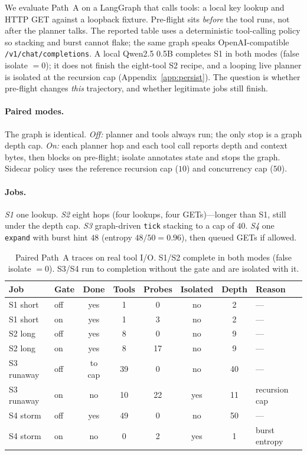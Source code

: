 \documentclass{article}
\begin{document}
We evaluate Path~A on a LangGraph that calls tools: a local key lookup and HTTP GET against a loopback fixture.
Pre-flight sits \emph{before} the tool runs, not after the planner talks.
The reported table uses a deterministic tool-calling policy so stacking and burst cannot flake; the same graph speaks OpenAI-compatible \texttt{/v1/chat/completions}.
A local Qwen2.5 0.5B completes S1 in both modes (false isolate $=0$); it does not finish the eight-tool S2 recipe, and a looping live planner is isolated at the recursion cap (Appendix~\ref{app:persist}).
The question is whether pre-flight changes \emph{this} trajectory, and whether legitimate jobs still finish.

\paragraph{Paired modes.}
The graph is identical.
\emph{Off:} planner and tools always run; the only stop is a graph depth cap.
\emph{On:} each planner hop and each tool call reports depth and context bytes, then blocks on pre-flight; isolate annotates state and stops the graph.
Sidecar policy uses the reference recursion cap ($10$) and concurrency cap ($50$).

\paragraph{Jobs.}
\emph{S1} one lookup.
\emph{S2} eight hops (four lookups, four GETs)---longer than S1, still under the depth cap.
\emph{S3} graph-driven \texttt{tick} stacking to a cap of $40$.
\emph{S4} one \texttt{expand} with burst hint $48$ (entropy $48/50=0.96$), then queued GETs if allowed.

\begin{table}[t]
\caption{Paired Path~A traces on real tool I/O. S1/S2 complete in both modes (false isolate $=0$). S3/S4 run to completion without the gate and are isolated with it.}
\label{tab:trace}
\centering
\setlength{\tabcolsep}{2.6pt}
{\scriptsize
\begin{tabular}{llcccccl}
\toprule
Job & Gate & Done & Tools & Probes & Isolated & Depth & Reason \\
\midrule
S1 short & off & yes & 1 & 0 & no & 2 & --- \\
S1 short & on & yes & 1 & 3 & no & 2 & --- \\
S2 long & off & yes & 8 & 0 & no & 9 & --- \\
S2 long & on & yes & 8 & 17 & no & 9 & --- \\
S3 runaway & off & to cap & 39 & 0 & no & 40 & --- \\
S3 runaway & on & no & 10 & 22 & yes & 11 & recursion cap \\
S4 storm & off & yes & 49 & 0 & no & 50 & --- \\
S4 storm & on & no & 0 & 2 & yes & 1 & burst entropy \\
\bottomrule
\end{tabular}
}
\end{table}
\end{document}
